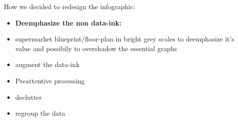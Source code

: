 How we decided to redesign the infographic:

\begin{itemize}
	\item \textbf{Deemphasize the non data-ink:} 
    \item supermarket blueprint/floor-plan in bright grey scales to deemphasize
		it's value and possibily to overshadow the essential graphs
	\item augment the data-ink
    \item Preattentive processing
	\item declutter
	\item regroup the data
\end{itemize}